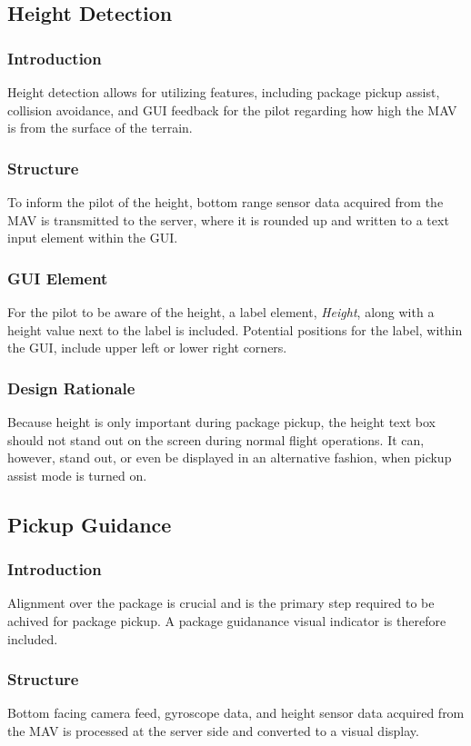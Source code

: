 \documentclass[onecolumn, oneside, letterpaper, draftclsnofoot, 10pt, compsoc]{IEEEtran}
\begin{document}
\subsection{Height Detection}
\subsubsection{Introduction}
Height detection allows for utilizing features, including package pickup assist, collision avoidance, and GUI feedback for the pilot regarding how high the MAV is from the surface of the terrain.

\subsubsection{Structure}
To inform the pilot of the height, bottom range sensor data acquired from the MAV is transmitted to the server, where it is rounded up and written to a text input element within the GUI.

\subsubsection{GUI Element}
For the pilot to be aware of the height, a label element, \textit{Height}, along with a height value next to the label is included. Potential positions for the label, within the GUI, include upper left or lower right corners.

\subsubsection{Design Rationale}
Because height is only important during package pickup, the height text box should not stand out on the screen during normal flight operations. It can, however, stand out, or even be displayed in an alternative fashion, when pickup assist mode is turned on.

\subsection{Pickup Guidance}
\subsubsection{Introduction}
Alignment over the package is crucial and is the primary step required to be achived for package pickup. A package guidanance visual indicator is therefore included.

\subsubsection{Structure}
Bottom facing camera feed, gyroscope data, and height sensor data acquired from the MAV is processed at the server side and converted to a visual display.
\end{document}
